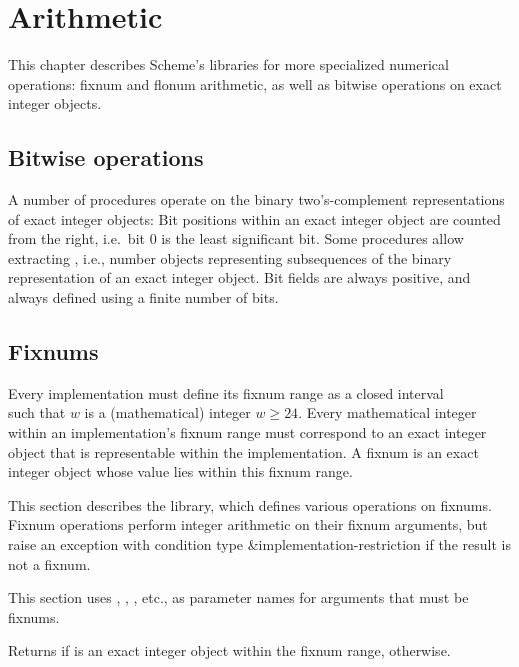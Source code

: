 \chapter{Arithmetic}
\label{numberchapter}

This chapter describes Scheme's libraries for more specialized
numerical operations: fixnum and flonum arithmetic, as well as bitwise
operations on exact integer objects.  

\section{Bitwise operations}

A number of procedures operate on the binary two's-complement
representations of exact integer objects: Bit positions within an
exact integer object are counted from the right, i.e.\ bit 0 is the
least significant bit.  Some procedures allow extracting , i.e., number objects representing subsequences of the
binary representation of an exact integer object.  Bit fields are
always positive, and always defined using a finite number of bits.

\section{Fixnums}
\label{fixnumssection}

Every implementation must define its fixnum range as a closed
interval
%
\begin{displaymath}
[-2^{w-1}, 2^{w-1} - 1]
\end{displaymath}
%
such that $w$ is a (mathematical) integer $w \geq 24$.  Every
mathematical integer within an implementation's fixnum range must
correspond to an exact integer object that is representable within the
implementation.
A fixnum is an exact integer object whose value lies within this
fixnum range.

This section describes the  library,
which defines various operations on fixnums.
Fixnum operations perform integer arithmetic on their fixnum
arguments, but raise an exception with condition type
{\cf\&implementation-restriction} if the result is not a fixnum.

This section uses , , , etc., as parameter
names for arguments that must be fixnums.

\begin{entry}{%
}

Returns \schtrue{} if  is an exact
integer object within the fixnum range, \schfalse{} otherwise.
\end{entry}

